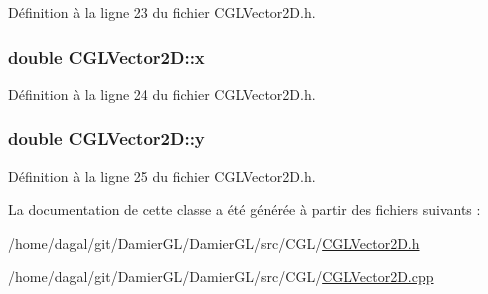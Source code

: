 Définition à la ligne 23 du fichier C\-G\-L\-Vector2\-D.\-h.

\hypertarget{class_c_g_l_vector2_d_adca68a6660d264b4fcb312c881c57861}{
\subsubsection[{x}]{\setlength{\rightskip}{0pt plus 5cm}double C\-G\-L\-Vector2\-D\-::x\hspace{0.3cm}{\ttfamily [protected]}}}\label{class_c_g_l_vector2_d_adca68a6660d264b4fcb312c881c57861}


Définition à la ligne 24 du fichier C\-G\-L\-Vector2\-D.\-h.

\hypertarget{class_c_g_l_vector2_d_a36a88cf9827f308a125e51164c73e21f}{
\subsubsection[{y}]{\setlength{\rightskip}{0pt plus 5cm}double C\-G\-L\-Vector2\-D\-::y\hspace{0.3cm}{\ttfamily [protected]}}}\label{class_c_g_l_vector2_d_a36a88cf9827f308a125e51164c73e21f}


Définition à la ligne 25 du fichier C\-G\-L\-Vector2\-D.\-h.



La documentation de cette classe a été générée à partir des fichiers suivants \-:\begin{DoxyCompactItemize}
\item 
/home/dagal/git/\-Damier\-G\-L/\-Damier\-G\-L/src/\-C\-G\-L/\hyperlink{_c_g_l_vector2_d_8h}{C\-G\-L\-Vector2\-D.\-h}\item 
/home/dagal/git/\-Damier\-G\-L/\-Damier\-G\-L/src/\-C\-G\-L/\hyperlink{_c_g_l_vector2_d_8cpp}{C\-G\-L\-Vector2\-D.\-cpp}\end{DoxyCompactItemize}
